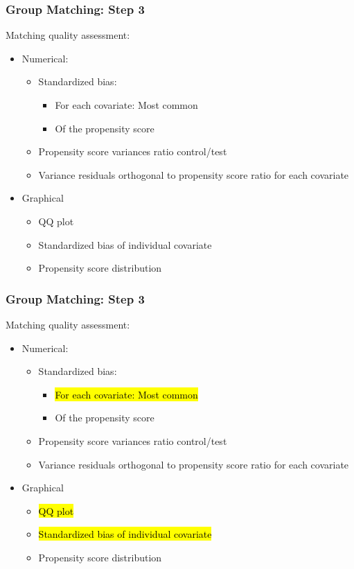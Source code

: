 \documentclass[xcolor=table]{beamer}
\makeatletter
\let\HL\hl
\renewcommand\hl{%
	\let\set@color\beamerorig@set@color
	\let\reset@color\beamerorig@reset@color
	\HL}
\makeatother
\begin{document}
\begin{frame}
	\frametitle{Group Matching: Step 3}
	Matching quality assessment:
	\begin{itemize}[label=$\blacktriangleright$]
		\item Numerical:
		\begin{itemize}[label=$\bullet$]
			\item Standardized bias:
			\begin{itemize}[label=$-$]
				\item For each covariate: Most common
				\item Of the propensity score
			\end{itemize}
			\item Propensity score variances ratio control/test
			\item Variance residuals orthogonal to propensity score ratio for each covariate
		\end{itemize}
		\item Graphical
		\begin{itemize}[label=$\bullet$]
			\item QQ plot
			\item Standardized bias of individual covariate
			\item Propensity score distribution
		\end{itemize}
	\end{itemize}
\end{frame}


\begin{frame}[noframenumbering]
	\frametitle{Group Matching: Step 3}
	Matching quality assessment:
	\begin{itemize}[label=$\blacktriangleright$]
		\item Numerical:
		\begin{itemize}[label=$\bullet$]
			\item Standardized bias:
			\begin{itemize}[label=$-$]
				\item \hl{For each covariate: Most common}
				\item Of the propensity score
			\end{itemize}
			\item Propensity score variances ratio control/test
			\item Variance residuals orthogonal to propensity score ratio for each covariate
		\end{itemize}
		\item Graphical
		\begin{itemize}[label=$\bullet$]
			\item \hl{QQ plot}
			\item \hl{Standardized bias of individual covariate}
			\item Propensity score distribution
		\end{itemize}
	\end{itemize}
\end{frame}
\end{document}
